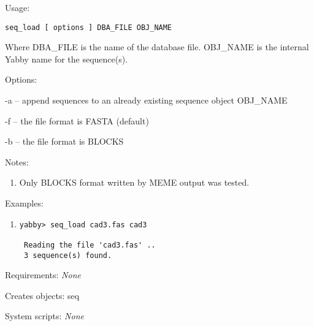 \begin{description}


\item{Usage:}

{\tt seq\_load [ options ] DBA\_FILE OBJ\_NAME}

Where DBA\_FILE is the name of the database file. OBJ\_NAME is
the internal Yabby name for the sequence(s).


\item{Options:}
\begin{description}
\item -a -- append sequences to an already existing sequence
object OBJ\_NAME
\item -f -- the file format is FASTA (default)
\item -b -- the file format is BLOCKS
\end{description}


\item{Notes:}
\begin{enumerate}
\item Only BLOCKS format written by MEME \cite{meme} output was tested.
\end{enumerate}


\item{Examples:}
\begin{enumerate}

\item
\begin{verbatim}
yabby> seq_load cad3.fas cad3

 Reading the file 'cad3.fas' ..
 3 sequence(s) found.
\end{verbatim}

\end{enumerate}


\item{Requirements:} {\em None}


\item{Creates objects:} seq


\item{System scripts:} {\em None}

\end{description}

